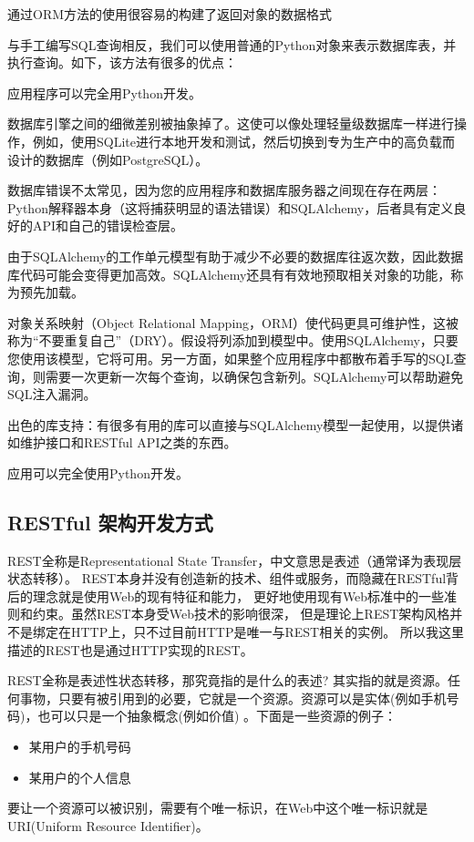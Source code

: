 通过ORM方法的使用很容易的构建了返回对象的数据格式

与手工编写SQL查询相反，我们可以使用普通的Python对象来表示数据库表，并执行查询。如下，该方法有很多的优点：

应用程序可以完全用Python开发。

数据库引擎之间的细微差别被抽象掉了。这使可以像处理轻量级数据库一样进行操作，例如，使用SQLite进行本地开发和测试，然后切换到专为生产中的高负载而设计的数据库（例如PostgreSQL）。

数据库错误不太常见，因为您的应用程序和数据库服务器之间现在存在两层：Python解释器本身（这将捕获明显的语法错误）和SQLAlchemy，后者具有定义良好的API和自己的错误检查层。

由于SQLAlchemy的工作单元模型有助于减少不必要的数据库往返次数，因此数据库代码可能会变得更加高效。SQLAlchemy还具有有效地预取相关对象的功能，称为预先加载。

对象关系映射（Object Relational Mapping，ORM）使代码更具可维护性，这被称为“不要重复自己”（DRY）。假设将列添加到模型中。使用SQLAlchemy，只要您使用该模型，它将可用。另一方面，如果整个应用程序中都散布着手写的SQL查询，则需要一次更新一次每个查询，以确保包含新列。SQLAlchemy可以帮助避免SQL注入漏洞。

出色的库支持：有很多有用的库可以直接与SQLAlchemy模型一起使用，以提供诸如维护接口和RESTful API之类的东西。

应用可以完全使用Python开发。


\subsection{RESTful 架构开发方式}
REST全称是Representational State Transfer，中文意思是表述（通常译为表现层状态转移）。 REST本身并没有创造新的技术、组件或服务，而隐藏在RESTful背后的理念就是使用Web的现有特征和能力， 更好地使用现有Web标准中的一些准则和约束。虽然REST本身受Web技术的影响很深， 但是理论上REST架构风格并不是绑定在HTTP上，只不过目前HTTP是唯一与REST相关的实例。 所以我这里描述的REST也是通过HTTP实现的REST。

REST全称是表述性状态转移，那究竟指的是什么的表述? 其实指的就是资源。任何事物，只要有被引用到的必要，它就是一个资源。资源可以是实体(例如手机号码)，也可以只是一个抽象概念(例如价值) 。下面是一些资源的例子：
\begin{itemize}
	\item 某用户的手机号码
	\item 某用户的个人信息
\end{itemize}

要让一个资源可以被识别，需要有个唯一标识，在Web中这个唯一标识就是URI(Uniform Resource Identifier)。

